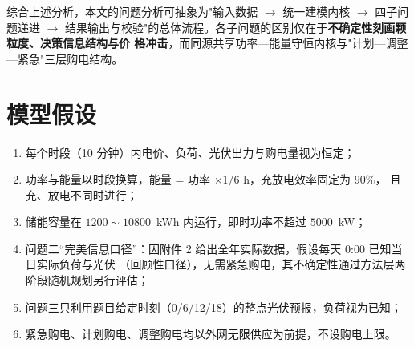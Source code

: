 \documentclass[withoutpreface]{cumcmthesis}
\begin{document}
综合上述分析，本文的问题分析可抽象为"输入数据 $\to$ 统一建模内核 $\to$ 四子问题递进 $\to$
结果输出与校验"的总体流程。各子问题的区别仅在于\textbf{不确定性刻画颗粒度、决策信息结构与价
格冲击}，而同源共享功率—能量守恒内核与"计划—调整—紧急"三层购电结构。

\section{模型假设}
\begin{enumerate}
    \item 每个时段（10 分钟）内电价、负荷、光伏出力与购电量视为恒定；
    \item 功率与能量以时段换算，能量 = 功率 $\times 1/6$ h，充放电效率固定为 $90\%$，
          且充、放电不同时进行；
    \item 储能容量在 $1200\sim10800$~kWh 内运行，即时功率不超过 $5000$~kW；
    \item 问题二“完美信息口径”：因附件 2 给出全年实际数据，假设每天 0:00 已知当日实际负荷与光伏
          （回顾性口径），无需紧急购电，其不确定性通过方法层两阶段随机规划另行评估；
    \item 问题三只利用题目给定时刻（0/6/12/18）的整点光伏预报，负荷视为已知；
    \item 紧急购电、计划购电、调整购电均以外网无限供应为前提，不设购电上限。
\end{enumerate}
\end{document}
